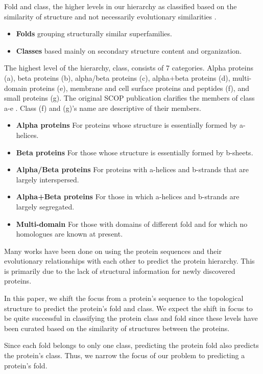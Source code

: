 \documentclass[12pt, a4paper, twocolumn, fullpage]{article}
\theoremstyle{plain}
\theoremstyle{definition}
\theoremstyle{remark}
\begin{document}
Fold and class, the higher levels in our hierarchy as classified based on the similarity of structure and not necessarily evolutionary similarities \cite{scope}. 

\begin{itemize}
   \item \textbf{Folds} grouping structurally similar superfamilies.
   \item \textbf{Classes} based mainly on secondary structure content and organization.
\end{itemize}

The highest level of the hierarchy, class, consists of 7 categories. Alpha proteins (a), beta proteins (b), alpha/beta proteins (c), alpha+beta proteins (d), multi-domain proteins (e), membrane and cell surface proteins and peptides (f), and small proteins (g). The original SCOP publication clarifies the members of class a-e \cite{SCOP}. Class (f) and (g)'s name are descriptive of their members.

\begin{itemize}
\item \textbf{Alpha proteins} For proteins whose structure is essentially formed by a-helices.
\item \textbf{Beta proteins} For those whose structure is essentially formed by b-sheets.
\item \textbf{Alpha/Beta proteins} For proteins with
a-helices and b-strands that are largely interspersed.
\item \textbf{Alpha+Beta proteins} For those in which
a-helices and b-strands are largely segregated.
\item \textbf{Multi-domain} For those with domains of different
fold and for which no homologues are known at
present.
\end{itemize}

Many works have been done on using the protein sequences and their evolutionary relationships with each other to predict the protein hierarchy. This is primarily due to the lack of structural information for newly discovered proteins. 

In this paper, we shift the focus from a protein's sequence to the topological structure to predict the protein's fold and class. We expect the shift in focus to be quite successful in classifying the protein class and fold since these levels have been curated based on the similarity of structures between the proteins.

Since each fold belongs to only one class, predicting the protein fold also predicts the protein's class. Thus, we narrow the focus of our problem to predicting a protein's fold.
\end{document}
